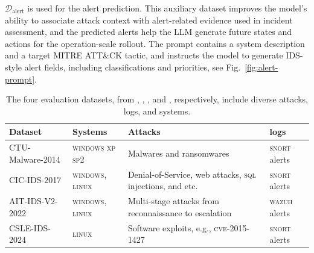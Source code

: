 \documentclass[sigconf]{acmart}
\begin{document}
$\mathcal{D}_{\mathrm{alert}}$ is used for the alert prediction. This auxiliary dataset improves the model's ability to associate attack context with alert-related evidence used in incident assessment, and the predicted alerts help the LLM generate future states and actions for the operation-scale rollout. The prompt contains a system description and a target MITRE ATT\&CK tactic, and instructs the model to generate IDS-style alert fields, including classifications and priorities, see Fig.~\ref{fig:alert-prompt}.      
\begin{table}[!ht]
    \centering
    \begin{tabular}{llll}
    \toprule
    Dataset & Systems & Attacks & logs\\
    \midrule
    CTU-Malware-2014     & \textsc{windows xp sp2} & Malwares and ransomwares & \textsc{snort} alerts\\
    CIC-IDS-2017     & \textsc{windows}, \textsc{linux} & Denial-of-Service, web attacks, \textsc{sql} injections, and etc.&\textsc{snort} alerts\\
    AIT-IDS-V2-2022 & \textsc{windows}, \textsc{linux} & Multi-stage attacks from reconnaissance to escalation& \textsc{wazuh} alerts\\
    CSLE-IDS-2024 & \textsc{linux} & Software exploits, e.g., \textsc{cve}-2015-1427&\textsc{snort} alerts \\
    \bottomrule
    \end{tabular}
    \caption{The four evaluation datasets, from \cite{GARCIA2014100}, \cite{ghorbani18dataset}, \cite{Wurzenberger24}, and \cite{kim24dataset}, respectively, include diverse attacks, logs, and systems.}
    \label{tab:dataset}
\end{table}


\end{document}
